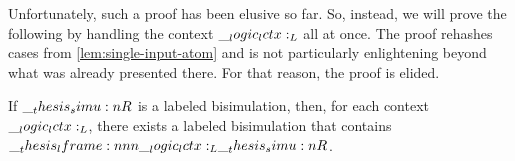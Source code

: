 Unfortunately, such a proof has been elusive so far.
So, instead, we will prove the following  by handling the context $\__logic_lctx:_L$ all at once.
The proof rehashes cases from \cref{lem:single-input-atom} and is not particularly enlightening beyond what was already presented there.
For that reason, the proof is elided.
%
\begin{lemma}\label{lem:ordered-bisimilarity:append-left}
  If $\__thesis_simu:n {R}$ is a labeled bisimulation, then, for each context $\__logic_lctx:_L$, there exists a labeled bisimulation that contains $\lframe{\lctx_L}{\simu{R}}$.
\end{lemma}


